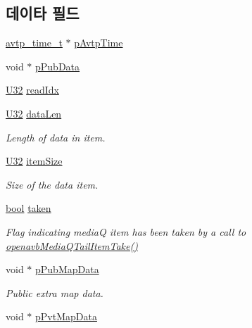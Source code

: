 \subsection*{데이타 필드}
\begin{DoxyCompactItemize}
\item 
\hyperlink{structavtp__time__t}{avtp\+\_\+time\+\_\+t} $\ast$ \hyperlink{structmedia__q__item__t_aa7a475459f9c1a43c64ed85ff1c758cc}{p\+Avtp\+Time}
\item 
void $\ast$ \hyperlink{structmedia__q__item__t_ac27724ac74fd97e91418f1539eccdfb0}{p\+Pub\+Data}
\item 
\hyperlink{openavb__types__base__pub_8h_a696390429f2f3b644bde8d0322a24124}{U32} \hyperlink{structmedia__q__item__t_a7581457a4c56a2aa1f2c76cdc2309d6b}{read\+Idx}
\item 
\hyperlink{openavb__types__base__pub_8h_a696390429f2f3b644bde8d0322a24124}{U32} \hyperlink{structmedia__q__item__t_a1dfc68b1003d0c64f82d4c19649c2c52}{data\+Len}
\begin{DoxyCompactList}\small\item\em Length of data in item. \end{DoxyCompactList}\item 
\hyperlink{openavb__types__base__pub_8h_a696390429f2f3b644bde8d0322a24124}{U32} \hyperlink{structmedia__q__item__t_a91e248b2730fbe7951ac5d9d3aae1752}{item\+Size}
\begin{DoxyCompactList}\small\item\em Size of the data item. \end{DoxyCompactList}\item 
\hyperlink{avb__gptp_8h_af6a258d8f3ee5206d682d799316314b1}{bool} \hyperlink{structmedia__q__item__t_a2f82d1d1293c3de8527c67be4b2880f9}{taken}
\begin{DoxyCompactList}\small\item\em Flag indicating mediaQ item has been taken by a call to \hyperlink{build_2sdk__eavb_2openavb__mediaq__pub_8h_a1cba0078992041670a37d66dddb86072}{openavb\+Media\+Q\+Tail\+Item\+Take()} \end{DoxyCompactList}\item 
void $\ast$ \hyperlink{structmedia__q__item__t_aa95927d84c1d7409725f2e169b8ec342}{p\+Pub\+Map\+Data}
\begin{DoxyCompactList}\small\item\em Public extra map data. \end{DoxyCompactList}\item 
void $\ast$ \hyperlink{structmedia__q__item__t_af23c5feee139b93f1c9dfcb56f1eaa1d}{p\+Pvt\+Map\+Data}

\end{DoxyCompactItemize}
